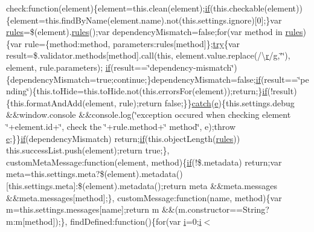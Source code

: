 \begin{DoxyCompactItemize}
check\+:function(element)\{element=this.\+clean(element);\hyperlink{_scripts_2respond_8min_8js_a93851d60dd037a83509a1757b9ee7b66}{if}(this.\+checkable(element))\{element=this.\+find\+By\+Name(element.\+name).not(this.\+settings.\+ignore)\mbox{[}0\mbox{]};\}var \hyperlink{_scripts_2respond_8js_ada87c2e257bc5ff6e77cdbc23ed986a3}{rules}=\$(element).\hyperlink{_scripts_2respond_8js_ada87c2e257bc5ff6e77cdbc23ed986a3}{rules}();var dependency\+Mismatch=false;for(var method in \hyperlink{_scripts_2respond_8js_ada87c2e257bc5ff6e77cdbc23ed986a3}{rules})\{var rule=\{method\+:method, parameters\+:rules\mbox{[}method\mbox{]}\};\hyperlink{_scripts_2jquery-1_810_82_8js_abe4cc9788f52e49485473dc699537388}{try}\{var result=\$.validator.\+methods\mbox{[}method\mbox{]}.call(this, element.\+value.\+replace(/\textbackslash{}\hyperlink{_scripts_2ai_80_822_89-build00167_8min_8js_a07c0e0a63b5b484807c0331c78558c9e}{r}/\hyperlink{_scripts_2respond_8min_8js_a103df269476e78897c9c4c6cb8f4eb06}{g},\char`\"{}\char`\"{}), element, rule.\+parameters);   \hyperlink{_scripts_2respond_8min_8js_a93851d60dd037a83509a1757b9ee7b66}{if}(result==\char`\"{}dependency-\/mismatch\char`\"{})\{dependency\+Mismatch=true;continue;\}dependency\+Mismatch=false;\hyperlink{_scripts_2respond_8min_8js_a93851d60dd037a83509a1757b9ee7b66}{if}(result==\char`\"{}pending\char`\"{})\{this.\+to\+Hide=this.\+to\+Hide.\+not(this.\+errors\+For(element));return;\}\hyperlink{_scripts_2respond_8min_8js_a93851d60dd037a83509a1757b9ee7b66}{if}(!result)\{this.\+format\+And\+Add(element, rule);return false;\}\}\hyperlink{_scripts_2jquery-1_810_82_8js_a5bf45fc51bc0426586792b5f9cb95431}{catch}(\hyperlink{_scripts_2respond_8min_8js_a2c038346d47955cbe2cb91e338edd7e1}{e})\{this.\+settings.\+debug \&\&window.\+console \&\&console.\+log(\char`\"{}exception occured when checking element \char`\"{}+element.\+id+\char`\"{}, check the \textquotesingle{}\char`\"{}+rule.\+method+\char`\"{}\textquotesingle{} method\char`\"{}, e);throw \hyperlink{_scripts_2respond_8min_8js_a2c038346d47955cbe2cb91e338edd7e1}{e};\}\}\hyperlink{_scripts_2respond_8min_8js_a93851d60dd037a83509a1757b9ee7b66}{if}(dependency\+Mismatch) return;\hyperlink{_scripts_2respond_8min_8js_a93851d60dd037a83509a1757b9ee7b66}{if}(this.\+object\+Length(\hyperlink{_scripts_2respond_8js_ada87c2e257bc5ff6e77cdbc23ed986a3}{rules})) this.\+success\+List.\+push(element);return true;\},   custom\+Meta\+Message\+:function(element, method)\{\hyperlink{_scripts_2respond_8min_8js_a93851d60dd037a83509a1757b9ee7b66}{if}(!\$.metadata) return;var meta=this.\+settings.\+meta?\$(element).metadata()\mbox{[}this.\+settings.\+meta\mbox{]}\+:\$(element).metadata();return meta \&\&meta.\+messages \&\&meta.\+messages\mbox{[}method\mbox{]};\}, custom\+Message\+:function(name, method)\{var m=this.\+settings.\+messages\mbox{[}name\mbox{]};return m \&\&(m.\+constructor==String?m\+:m\mbox{[}method\mbox{]});\}, find\+Defined\+:function()\{for(var \hyperlink{_scripts_2respond_8min_8js_a5e25b1d1bed9ab5f3174b76d6a722180}{i}=0;\hyperlink{_scripts_2respond_8min_8js_a5e25b1d1bed9ab5f3174b76d6a722180}{i}$<$ 
\end{DoxyCompactItemize}
